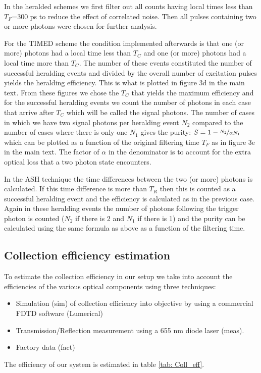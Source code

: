 \documentclass[reprint,onecolumn]{revtex4-1}
\begin{document}
In the heralded schemes we first filter out all counts having local
times less than $T_{F}$=300 ps to reduce the effect of correlated noise.
Then all pulses containing two or more photons were chosen for further
analysis. 

For the TIMED scheme the condition implemented afterwards is that
one (or more) photons had a local time less than $T_{C}$ and one
(or more) photons had a local time more than $T_{C}$. The number
of these events constituted the number of successful heralding events
and divided by the overall number of excitation pulses yields the
heralding efficiency. This is what is
plotted in figure 3d in the main text. From these figures we chose
the $T_{C}$ that yields the maximum efficiency and for the successful
heralding events we count the number of photons in each case that
arrive after $T_{C}$ which will be called the signal photons. The
number of cases in which we have two signal photons per heralding
event $N_{2}$ compared to the number of cases where there is only
one $N_{1}$ gives the purity: $S=1-\nicefrac{N_{2}}{\alpha N_{1}}$
which can be plotted as a function of the original filtering time
$T_{F}$ as in figure 3e in the main text. The factor of $\alpha$ in the denominator is to account for the extra optical loss that a two photon state encounters. 

In the ASH technique the time differences between the two (or more)
photons is calculated. If this time difference is more than $T_{R}$
then this is counted as a successful heralding event and the efficiency
is calculated as in the previous
case. Again in these heralding events the number of photons following
the trigger photon is counted ($N_{2}$ if there is 2 and $N_{1}$
if there is 1) and the purity can be calculated using the same formula
as above as a function of the filtering time. 

\subsection{Collection efficiency estimation}

To estimate the collection efficiency in our setup we take into account the efficiencies of the various optical components using three techniques:
\begin{itemize}
\item Simulation (sim) of collection efficiency into objective by using
a commercial FDTD software (Lumerical)
\item Transmission/Reflection measurement using a 655 nm diode laser (meas).
\item Factory data (fact)
\end{itemize}
The efficiency of our system is estimated in table \ref{tab: Coll_eff}. 
\end{document}
